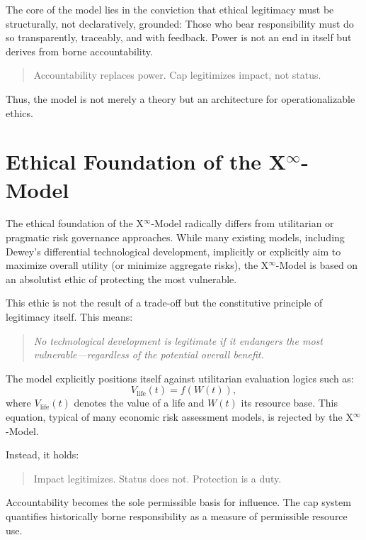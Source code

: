 \documentclass[11pt]{article}
\begin{document}
The core of the model lies in the conviction that ethical legitimacy must be structurally, not declaratively, grounded: Those who bear responsibility must do so transparently, traceably, and with feedback. Power is not an end in itself but derives from borne accountability.

\begin{quote}
Accountability replaces power. Cap legitimizes impact, not status.
\end{quote}

Thus, the model is not merely a theory but an architecture for operationalizable ethics.

\section{Ethical Foundation of the X$^\infty$-Model}
The ethical foundation of the X$^\infty$-Model radically differs from utilitarian or pragmatic risk governance approaches. While many existing models, including Dewey’s differential technological development, implicitly or explicitly aim to maximize overall utility (or minimize aggregate risks), the X$^\infty$-Model is based on an absolutist ethic of protecting the most vulnerable.

This ethic is not the result of a trade-off but the constitutive principle of legitimacy itself. This means:

\begin{quote}
\emph{No technological development is legitimate if it endangers the most vulnerable—regardless of the potential overall benefit.}
\end{quote}

The model explicitly positions itself against utilitarian evaluation logics such as:
\begin{equation}
V_{\text{life}}(t) = f(W(t)),
\end{equation}
where $V_{\text{life}}(t)$ denotes the value of a life and $W(t)$ its resource base. This equation, typical of many economic risk assessment models, is rejected by the X$^\infty$-Model.

Instead, it holds:
\begin{quote}
Impact legitimizes. Status does not. Protection is a duty.
\end{quote}

Accountability becomes the sole permissible basis for influence. The cap system quantifies historically borne responsibility as a measure of permissible resource use.
\end{document}
